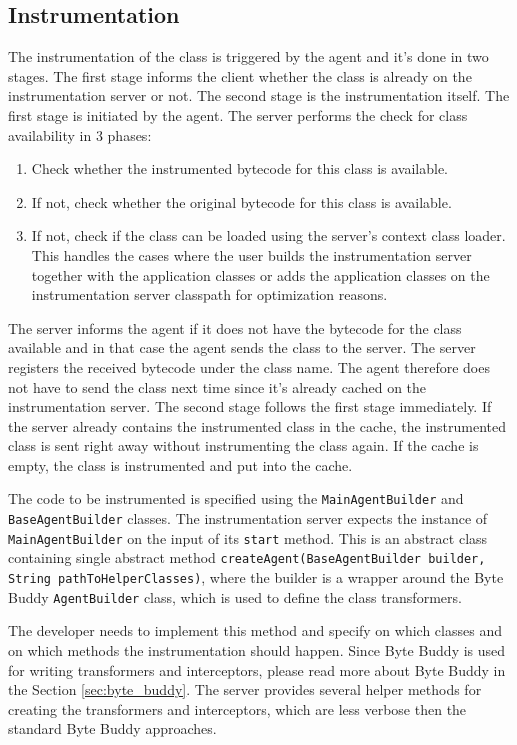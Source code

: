 \subsection{Instrumentation}
The instrumentation of the class is triggered by the agent and it's done in two stages. The first stage informs the client whether the class is already on the instrumentation server or not. The second stage is the instrumentation itself. The first stage is initiated by the agent. The server performs the check for class availability in 3 phases:
\begin{enumerate}
	\item Check whether the instrumented bytecode for this class is available.
	\item If not, check whether the original bytecode for this class is available.
	\item If not, check if the class can be loaded using the server's context class loader. This handles the cases where the user builds the instrumentation server together with the application classes or adds the application classes on the instrumentation server classpath for optimization reasons.
\end{enumerate}

The server informs the agent if it does not have the bytecode for the class available and in that case  the agent sends the class to the server. The server registers the received bytecode under the class name. The agent therefore does not have to send the class next time since it's already cached on the instrumentation server.
The second stage follows the first stage immediately. If the server already contains the instrumented class in the cache, the instrumented class is sent right away without instrumenting the class again. If the cache is empty, the class is instrumented and put into the cache.

The code to be  instrumented is specified using the \texttt{MainAgentBuilder} and \texttt{BaseAgentBuilder} classes.
The instrumentation server expects the instance of \texttt{MainAgentBuilder} on the input of its \texttt{start} method. This is an abstract class containing single abstract method \texttt{createAgent(BaseAgentBuilder builder, String pathToHelperClasses)}, where the builder is a wrapper around the Byte Buddy \texttt{AgentBuilder} class, which is used to define the class transformers.

The developer needs to implement this method and specify on which classes and on which methods the instrumentation should happen. Since Byte Buddy is used for writing transformers and interceptors, please read more about Byte Buddy in the Section \ref{sec:byte_buddy}. The server provides several helper methods for creating the transformers and interceptors, which are less verbose then the standard Byte Buddy approaches.

